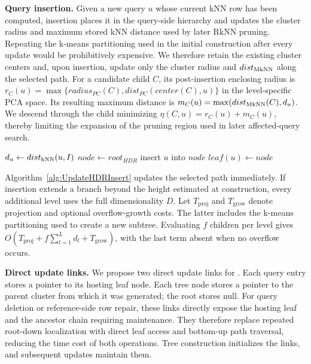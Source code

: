 \noindent\textbf{Query insertion.}
Given a new query $u$ whose current kNN row has been computed, insertion places it in the query-side hierarchy and updates the cluster radius and maximum stored kNN distance used by later RkNN pruning. Repeating the k-means partitioning used in the initial construction after every update would be prohibitively expensive. We therefore retain the existing cluster centers and, upon insertion, update only the cluster radius and $dist_{\operatorname{MkNN}}$ along the selected path. For a candidate child $C$, its post-insertion enclosing radius is $r_C(u)=\max\{radius_{PC}(C),dist_{PC}(center(C),u)\}$ in the level-specific PCA space. Its resulting maximum distance is $m_C(u)=\max(dist_{\operatorname{MkNN}}(C),d_u)$. We descend through the child minimizing $\eta(C,u)=r_C(u)+m_C(u)$, thereby limiting the expansion of the pruning region used in later affected-query search.

\begin{algorithm}[t]
\caption{Update\_HDR\_Insert($u$)}
\label{alg:UpdateHDRInsert}
$d_u \leftarrow dist_{\operatorname{kNN}}(u,I)$\;
$node \leftarrow root_{HDR}$\;
insert $u$ into $node$\;
$leaf(u)\leftarrow node$\;
\end{algorithm}

Algorithm~\ref{alg:UpdateHDRInsert} updates the selected path immediately. If insertion extends a branch beyond the height estimated at construction, every additional level uses the full dimensionality $D$. Let $T_{\mathrm{proj}}$ and $T_{\mathrm{grow}}$ denote projection and optional overflow-growth costs. The latter includes the k-means partitioning used to create a new subtree. Evaluating $f$ children per level gives $O(T_{\mathrm{proj}}+f\sum_{l=1}^{L}d_l+T_{\mathrm{grow}})$, with the last term absent when no overflow occurs.

\noindent\textbf{Direct update links.}
We propose two direct update links for \hdrtree. Each query entry stores a pointer to its hosting leaf node. Each tree node stores a pointer to the parent cluster from which it was generated; the root stores null. For query deletion or reference-side row repair, these links directly expose the hosting leaf and the ancestor chain requiring maintenance. They therefore replace repeated root-down localization with direct leaf access and bottom-up path traversal, reducing the time cost of both operations. Tree construction initializes the links, and subsequent updates maintain them.

